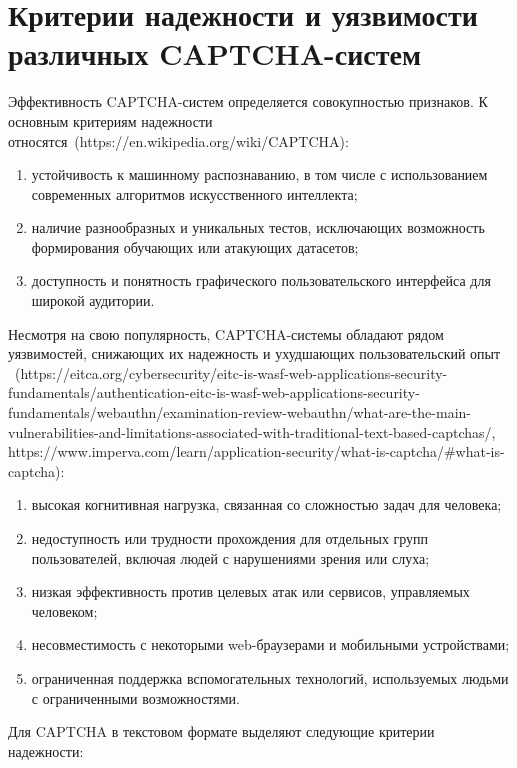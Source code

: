 \section{Критерии надежности и уязвимости различных CAPTCHA-систем}

Эффективность CAPTCHA-систем определяется совокупностью признаков. К основным 
критериям надежности относятся~(https://en.wikipedia.org/wiki/CAPTCHA):

\begin{enumerate}
    \item устойчивость к машинному распознаванию, в том числе с использованием 
    современных алгоритмов искусственного интеллекта;
    \item наличие разнообразных и уникальных тестов, исключающих возможность 
    формирования обучающих или атакующих датасетов;
    \item доступность и понятность графического пользовательского интерфейса для 
    широкой аудитории.
\end{enumerate}

Несмотря на свою популярность, CAPTCHA-системы обладают рядом уязвимостей, 
снижающих их надежность и ухудшающих пользовательский опыт
~(https://eitca.org/cybersecurity/eitc-is-wasf-web-applications-security-fundamentals/authentication-eitc-is-wasf-web-applications-security-fundamentals/webauthn/examination-review-webauthn/what-are-the-main-vulnerabilities-and-limitations-associated-with-traditional-text-based-captchas/,
https://www.imperva.com/learn/application-security/what-is-captcha/\#what-is-captcha):

\begin{enumerate}
    \item высокая когнитивная нагрузка, связанная со сложностью задач для 
    человека;
    \item недоступность или трудности прохождения для отдельных групп 
    пользователей, включая людей с нарушениями зрения или слуха;
    \item низкая эффективность против целевых атак или сервисов, управляемых 
    человеком;
    \item несовместимость с некоторыми web-браузерами и мобильными устройствами;
    \item ограниченная поддержка вспомогательных технологий, используемых людьми 
    с ограниченными возможностями.
\end{enumerate}

Для CAPTCHA в текстовом формате выделяют следующие критерии надежности:

